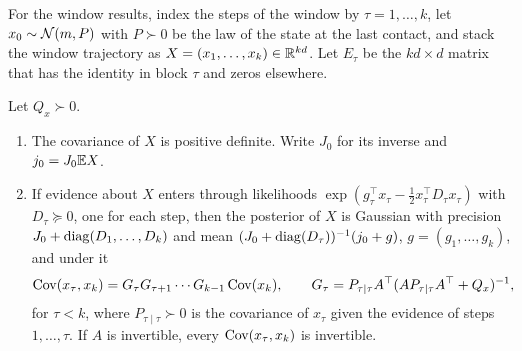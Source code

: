For the window results, index the steps of the window by $\tau=1,\dots,k$, let $x_0\sim\mathcal{N}(m,P)$ with $P\succ0$ be the law of the state at the last contact, and stack the window trajectory as $X=(x_1,\dots,x_k)\in\mathbb{R}^{kd}$. Let $E_\tau$ be the $kd\times d$ matrix that has the identity in block $\tau$ and zeros elsewhere.

\begin{lemma}\label{lem:prv-trajectory}
Let $Q_x\succ0$.
\begin{enumerate}
\item[(a)] The covariance of $X$ is positive definite. Write $J_0$ for its inverse and $j_0=J_0\mathbb{E} X$.
\item[(b)] If evidence about $X$ enters through likelihoods $\exp(g_\tau^\top x_\tau-\frac12x_\tau^\top D_\tau x_\tau)$ with $D_\tau\succeq0$, one for each step, then the posterior of $X$ is Gaussian with precision $J_0+\operatorname{diag}(D_1,\dots,D_k)$ and mean $(J_0+\operatorname{diag}(D_\tau))^{-1}(j_0+g)$, $g=(g_1,\dots,g_k)$, and under it
\begin{equation}\label{eq:prv-smoother}
\operatorname{Cov}(x_\tau,x_k)=G_\tau G_{\tau+1}\cdots G_{k-1}\operatorname{Cov}(x_k),\qquad G_\tau=P_{\tau\mid\tau}A^\top(AP_{\tau\mid\tau}A^\top+Q_x)^{-1},
\end{equation}
for $\tau<k$, where $P_{\tau\mid\tau}\succ0$ is the covariance of $x_\tau$ given the evidence of steps $1,\dots,\tau$. If $A$ is invertible, every $\operatorname{Cov}(x_\tau,x_k)$ is invertible.
\end{enumerate}
\end{lemma}

